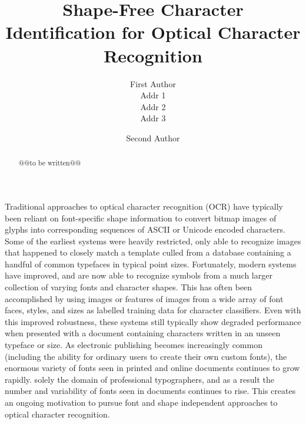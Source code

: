 \documentclass[times, 10pt,twocolumn]{article}
\begin{document}
\title{Shape-Free Character Identification for Optical Character Recognition}

\author{First Author\\
Addr 1\\
Addr 2\\
Addr 3\\
\and
Second Author\\
}


\maketitle
\thispagestyle{empty}


\begin{abstract}
@@to be written@@
\end{abstract}



Traditional approaches to optical character recognition (OCR) have typically
been reliant on font-specific shape information to convert bitmap
images of glyphs into corresponding sequences of ASCII or Unicode encoded
characters.  Some of the earliest systems were heavily restricted, only
able to recognize images that happened to closely match a template culled from
a database containing a handful of common typefaces in typical point
sizes.  Fortunately, modern systems have improved, and are now able to recognize
symbols from a much larger collection of varying fonts and character shapes.  
This has often been accomplished by using images or features of images from a 
wide array of font faces, styles, and sizes as labelled training data for 
character classifiers.  Even with this improved robustness, these systems 
still typically show degraded performance when presented with a document 
containing characters written in an unseen typeface or size.  
As electronic publishing becomes increasingly common (including the
ability for ordinary users to create their own custom fonts), the enormous
variety of fonts seen in printed and online documents continues to grow rapidly.
solely the domain of professional typographers, and as a result the number and 
variability of fonts seen in documents continues to rise.  
This creates an ongoing motivation to pursue font and shape
independent approaches to  optical character recognition.
\end{document}

